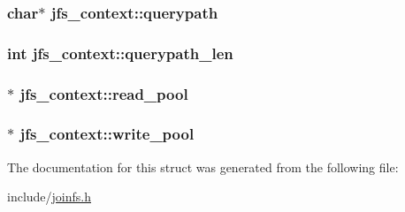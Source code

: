 \label{structjfs__context_a4f819b63c7abd6d48eaa8aee3963b741}
\hypertarget{structjfs__context_a67f036982dd208c903bb0ef7e2d18894}{
\subsubsection[{querypath}]{\setlength{\rightskip}{0pt plus 5cm}char$\ast$ {\bf jfs\_\-context::querypath}}}
\label{structjfs__context_a67f036982dd208c903bb0ef7e2d18894}
\hypertarget{structjfs__context_a2e1a836c640ab2e62aad24469acbf599}{
\subsubsection[{querypath\_\-len}]{\setlength{\rightskip}{0pt plus 5cm}int {\bf jfs\_\-context::querypath\_\-len}}}
\label{structjfs__context_a2e1a836c640ab2e62aad24469acbf599}
\hypertarget{structjfs__context_a407aea616bfd6fae32ef4e4a8adffa7a}{
\subsubsection[{read\_\-pool}]{$\ast$ {\bf jfs\_\-context::read\_\-pool}}}
\label{structjfs__context_a407aea616bfd6fae32ef4e4a8adffa7a}
\hypertarget{structjfs__context_af6a489c5b07ac7edac9e7c9c8394bfe1}{
\subsubsection[{write\_\-pool}]{$\ast$ {\bf jfs\_\-context::write\_\-pool}}}
\label{structjfs__context_af6a489c5b07ac7edac9e7c9c8394bfe1}


The documentation for this struct was generated from the following file:\begin{DoxyCompactItemize}
\item 
include/\hyperlink{joinfs_8h}{joinfs.h}\end{DoxyCompactItemize}
